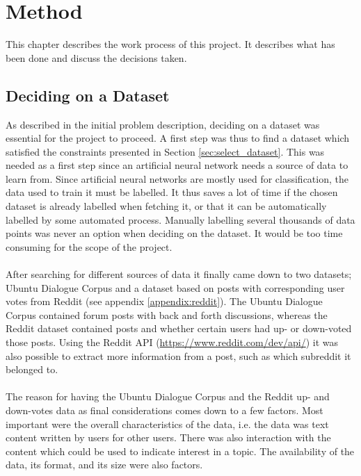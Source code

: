 \chapter{Method}\label{chap:method}
This chapter describes the work process of this project. It describes what has been done and discuss the decisions taken.

\section{Deciding on a Dataset}\label{sec:deciding_dataset}
As described in the initial problem description, deciding on a dataset was essential for the project to proceed. A first step was thus to find a dataset which satisfied the constraints presented in Section \ref{sec:select_dataset}. This was needed as a first step since an artificial neural network needs a source of data to learn from. Since artificial neural networks are mostly used for classification, the data used to train it must be labelled. It thus saves a lot of time if the chosen dataset is already labelled when fetching it, or that it can be automatically labelled by some automated process. Manually labelling several thousands of data points was never an option when deciding on the dataset. It would be too time consuming for the scope of the project.
\\\\
After searching for different sources of data it finally came down to two datasets; Ubuntu Dialogue Corpus \parencite{lowe2015ubuntu} and a dataset based on posts with corresponding user votes from Reddit (see appendix \ref{appendix:reddit}). The Ubuntu Dialogue Corpus contained forum posts with back and forth discussions, whereas the Reddit dataset contained posts and whether certain users had up- or down-voted those posts. Using the Reddit API (\url{https://www.reddit.com/dev/api/}) it was also possible to extract more information from a post, such as which subreddit it belonged to.
\\\\
The reason for having the Ubuntu Dialogue Corpus and the Reddit up- and down-votes data as final considerations comes down to a few factors. Most important were the overall characteristics of the data, i.e. the data was text content written by users for other users. There was also interaction with the content which could be used to indicate interest in a topic. The availability of the data, its format, and its size were also factors.
\\\\
